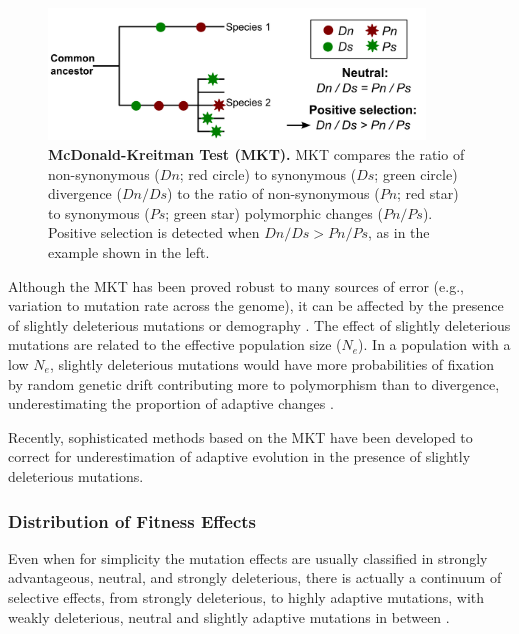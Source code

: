\begin{figure}[h]
  \includegraphics[width=10cm]{./Images/MKT.png}
  \centering
  \caption{\textbf{McDonald-Kreitman Test (MKT).} MKT compares the ratio of non-synonymous ($Dn$; red circle) to synonymous ($Ds$; green circle) divergence ($Dn/Ds$) to the ratio of non-synonymous ($Pn$; red star) to synonymous ($Ps$; green star) polymorphic changes ($Pn/Ps$). Positive selection is detected when $Dn/Ds > Pn/Ps$, as in the example shown in the left.
   }
  \label{fig:MKT}
\end{figure}

Although the MKT has been proved robust to many sources of error (e.g., variation to mutation rate across the genome), it can be affected by the presence of slightly deleterious mutations or demography \citep{Messer2013,Eyre-Walker2006a}. 
%
The effect of slightly deleterious mutations are related to the effective population size ($N_{e}$). In a population with a low $N_{e}$, slightly deleterious mutations would have more probabilities of fixation by random genetic drift contributing more to polymorphism than to divergence, underestimating the proportion of adaptive changes \citep{Messer2013}.

Recently, sophisticated methods based on the MKT have been developed to correct for underestimation of adaptive evolution in the presence of slightly deleterious mutations. 


\subsubsection{Distribution of Fitness Effects}

Even when for simplicity the mutation effects are usually classified in strongly advantageous, neutral, and strongly deleterious, there is actually a continuum of selective effects, from strongly deleterious, 
to highly adaptive mutations, with weakly deleterious, neutral and slightly adaptive mutations in between \citep{Eyre-Walker2007}.

